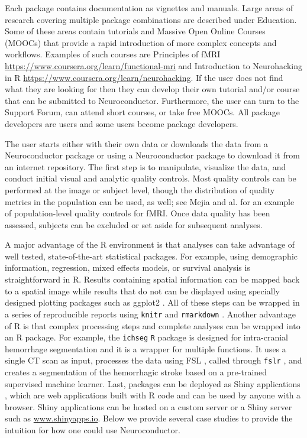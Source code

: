 \documentclass[]{elsarticle} %
\begin{document}
Each package contains documentation as vignettes and manuals. Large areas of research covering multiple package combinations are described under Education. Some of these areas contain tutorials and Massive  Open Online Courses (MOOCs) that provide a rapid introduction of more complex concepts and workflows. Examples of such courses are Principles of fMRI  \url{https://www.coursera.org/learn/functional-mri} and Introduction to Neurohacking in R \url{https://www.coursera.org/learn/neurohacking}.  If the user does not find what they are looking for then they can develop their own tutorial and/or course that can be submitted to Neuroconductor. Furthermore, the user can turn to the Support Forum,  can attend short courses, or take free MOOCs. All package developers are users and some users become package developers.

The user starts either with their own data or downloads the data from a Neuroconductor package or using a Neuroconductor package to download it from an internet repository.  The first step is to manipulate, visualize the data, and conduct initial visual and analytic quality controls.  Most quality controls can be performed at the image or subject level, though the distribution of quality metrics in the population can be used, as well; see Mejia and al. \citep{mejia2015pca} for an example of population-level quality controls for fMRI. Once data quality has been assessed, subjects can be excluded or set aside for subsequent analyses.   

A major advantage of the R environment is that analyses can take advantage of well tested,  state-of-the-art statistical packages. For example, using demographic information,  regression, mixed effects models, or survival analysis is straightforward in R.  Results containing spatial information can be mapped back to a spatial image while results that do not can be displayed using specially designed plotting packages such as ggplot2 \citep{ggplot2}.  All of these steps can be wrapped in a series of reproducible reports using \verb"knitr" and \verb"rmarkdown" \citep{rmarkdown,knitr}. Another advantage of R is that complex processing steps and complete analyses can be wrapped into an R package. For example, the \verb"ichseg" \cite{ichseg,muschelli2016pitch} \verb"R" package is designed for intra-cranial hemorrhage segmentation and it is a wrapper for multiple functions. It uses a  single CT scan as input, processes the data using FSL \citep{fsl}, called through \texttt{fslr} \citep{fslr}, and creates a segmentation of the hemorrhagic stroke based on a pre-trained supervised machine learner. Last, packages can be deployed as Shiny applications \citep{shiny}, which are web applications built with R code and can be used by anyone with a browser.  Shiny applications can be hosted on a custom server or a Shiny server such as \url{www.shinyapps.io}. Below we provide several case studies to provide the intuition for how one could use Neuroconductor.
\end{document}
